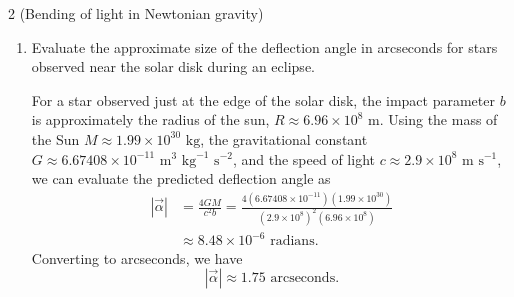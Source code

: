 \documentclass[11pt]{article}
\begin{document}
\begin{problem}{2 (Bending of light in Newtonian gravity)}
\begin{enumerate}[label=(\alph*)]
\begin{answer}
            We have
            \begin{equation}
            \label{eq:51}
            \dot{\vec{\delta x}} = \begin{pmatrix}
\frac{m_{G}}{m_{I}} \frac{2GM}{cb} \\
0 \\
0
 \end{pmatrix}
            \end{equation}
            so that the deflection angle magnitude is
            \begin{equation}
            \label{eq:52}
            | \vec{\alpha} | = \left | -\frac{\dot{\vec{\delta x}}}{ | \dot{\vec{x}}_{(0)} | } \right | = \left| \frac{\dot{\vec{\delta x}}}{c} \right| = \frac{m_{G}}{m_I} \frac{2GM}{c^2 b},
            \end{equation}
            as desired.
		      \end{answer}
          Observations of the position of stars during solar eclipses are consistent with the angle predicted by general relativity,
          \begin{equation}
          \label{eq:25}
          | \vec{\alpha} | = \frac{4GM}{c^2 b}.
          \end{equation}
		\item Evaluate the approximate size of the deflection angle in arcseconds for stars observed near the solar disk during an eclipse.
\begin{answer}
  For a star observed just at the edge of the solar disk, the impact parameter \( b \) is approximately the radius of the sun, \( R \approx 6.96 \times 10^8 \text{ m} \).
  Using the mass of the Sun \( M \approx 1.99 \times 10^{30} \text{ kg} \),
  the gravitational constant \( G \approx 6.67408 \times 10^{-11} \text{ m}^3 \text{ kg}^{-1} \text{ s}^{-2} \), and the speed of light \( c \approx 2.9 \times 10^8 \text{ m s}^{-1} \), we can evaluate the predicted deflection angle as
		      \begin{equation}
            \begin{aligned}
		      \label{eq:deflection_eval}
		      |\vec{\alpha}| &= \frac{4GM}{c^2 b} = \frac{4 (6.67408 \times 10^{-11}) (1.99 \times 10^{30})}{(2.9 \times 10^8)^2 (6.96 \times 10^8)} \\ &\approx
		      		      8.48 \times 10^{-6} \text{ radians}.
              \end{aligned}
		      \end{equation}
          Converting to arcseconds, we have
		      \begin{equation}
		      \label{eq:deflection_arcsec}
		      |\vec{\alpha}| \approx 1.75 \text{ arcseconds}.
		      \end{equation}
		      \end{answer}
	\end{enumerate}
\end{problem}
\end{document}
